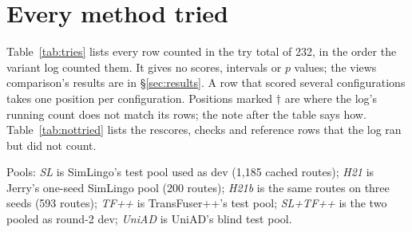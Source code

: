 \section{Every method tried}
\label{sec:tries}

Table~\ref{tab:tries} lists every row counted in the try total of 232, in the
order the variant log counted them. It gives no scores, intervals or $p$ values;
the views comparison's results are in \S\ref{sec:results}. A row that
scored several configurations takes one position per configuration. Positions
marked $\dagger$ are where the log's running count does not match its rows; the
note after the table says how. Table~\ref{tab:nottried} lists the rescores,
checks and reference rows that the log ran but did not count.

Pools: \emph{SL} is SimLingo's test pool used as dev (1,185 cached routes);
\emph{H21} is Jerry's one-seed SimLingo pool (200 routes); \emph{H21b} is the same
routes on three seeds (593 routes); \emph{TF++} is TransFuser++'s test pool;
\emph{SL+TF++} is the two pooled as round-2 dev; \emph{UniAD} is UniAD's blind
test pool.

